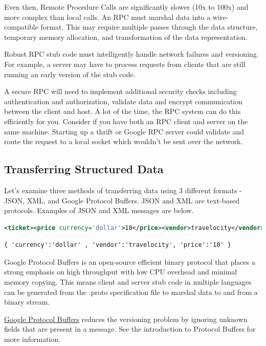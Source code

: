 Even then, Remote Procedure Calls are significantly slower (10x to 100x) and more complex than local calls.
An RPC must marshal data into a wire-compatible format.
This may require multiple passes through the data structure, temporary memory allocation, and transformation of the data representation.

Robust RPC stub code must intelligently handle network failures and versioning.
For example, a server may have to process requests from clients that are still running an early version of the stub code.

A secure RPC will need to implement additional security checks including authentication and authorization, validate data and encrypt communication between the client and host.
A lot of the time, the RPC system can do this efficiently for you. Consider if you have both an RPC client and server on the same machine.
Starting up a thrift or Google RPC server could validate and route the request to a local socket which wouldn't be sent over the network.

\subsection{Transferring Structured Data}

Let's examine three methods of transferring data using 3 different formats - JSON, XML, and Google Protocol Buffers.
JSON and XML are text-based protocols.
Examples of JSON and XML messages are below.

\begin{lstlisting}[language=XML]
<ticket><price currency='dollar'>10</price><vendor>travelocity</vendor></ticket>
\end{lstlisting}

\begin{lstlisting}
{ 'currency':'dollar' , 'vendor':'travelocity', 'price':'10' }
\end{lstlisting}

Google Protocol Buffers is an open-source efficient binary protocol that places a strong emphasis on high throughput with low CPU overhead and minimal memory copying.
This means client and server stub code in multiple languages can be generated from the .proto specification file to marshal data to and from a binary stream.

\href{https://developers.google.com/protocol-buffers/docs/overview}{Google Protocol Buffers} reduces the versioning problem by ignoring unknown fields that are present in a message.
See the introduction to Protocol Buffers for more information.

